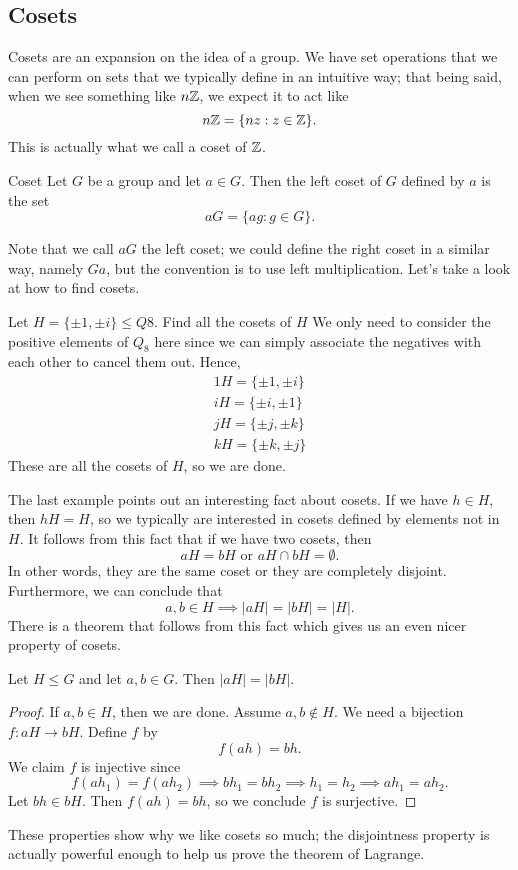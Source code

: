 \subsection*{Cosets}
Cosets are an expansion on the idea of a group. We have set operations that we can perform on sets that we typically define in an intuitive way; that being said, when we see something like $n\mathbb{Z}$, we expect it to act like
\[
	n\mathbb{Z} = \{nz:z\in\mathbb{Z}\}.
\]
This is actually what we call a coset of $\mathbb{Z}$.
\begin{definition}{Coset}
	Let $G$ be a group and let $a\in G$. Then the left coset of $G$ defined by $a$ is the set
	\[
		aG=\{ag:g\in G\}.
	\]
\end{definition}

Note that we call $aG$ the left coset; we could define the right coset in a similar way, namely $Ga$, but the convention is to use left multiplication. Let's take a look at how to find cosets.

\begin{example}{Let $H=\{\pm 1, \pm i\}\leq Q{8}$. Find all the cosets of $H$}
	We only need to consider the positive elements of $Q_{8}$ here since we can simply associate the negatives with each other to cancel them out. Hence,
	\begin{gather*}
		1H=\{\pm 1, \pm i\}\\
		iH=\{\pm i, \pm 1\}\\
		jH=\{\pm j, \pm k\}\\
		kH=\{\pm k, \pm j\}
	\end{gather*}
	These are all the cosets of $H$, so we are done.
\end{example}

The last example points out an interesting fact about cosets. If we have $h\in H$, then $hH=H$, so we typically are interested in cosets defined by elements not in $H$. It follows from this fact that if we have two cosets, then
\[
	aH=bH\text{ or } aH\cap bH=\emptyset.
\]
In other words, they are the same coset or they are completely disjoint. Furthermore, we can conclude that
\[
	a,b\in H\implies |aH|=|bH|=|H|.
\]
There is a theorem that follows from this fact which gives us an even nicer property of cosets.
\begin{theorem}{}
	Let $H\leq G$ and let $a,b\in G$. Then $|aH|=|bH|$.
\end{theorem}
\begin{proof}
	If $a,b\in H$, then we are done. Assume $a,b\not\in H$. We need a bijection $f:aH\to bH$. Define $f$ by
	\[
		f(ah) = bh.
	\]
	We claim $f$ is injective since
	\[
		f(ah_{1})=f(ah_{2})\implies bh_{1}=bh_{2}\implies h_{1}=h_{2}\implies ah_{1}=ah_{2}.
	\]
	Let $bh\in bH$. Then $f(ah)=bh$, so we conclude $f$ is surjective.
\end{proof}
These properties show why we like cosets so much; the disjointness property is actually powerful enough to help us prove the theorem of Lagrange.

